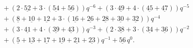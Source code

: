 \begin{align*}
	&\quad+(2\cdot\underline{52}+3\cdot(\underline{54}+\underline{56}))q^{-6}+(3\cdot\underline{49}+4\cdot(\underline{45}+\underline{47}))q^{-5}\\
	&\quad+(\underline{8}+\underline{10}+\underline{12}+3\cdot(\underline{16}+\underline{26}+\underline{28}+\underline{30}+\underline{32}))q^{-4}\\
	&\quad+(3\cdot\underline{41}+4\cdot(\underline{39}+\underline{43}))q^{-3}+(2\cdot\underline{38}+3\cdot(\underline{34}+\underline{36}))q^{-2}\\
	&\quad+(\underline{5}+\underline{13}+\underline{17}+\underline{19}+\underline{21}+\underline{23})q^{-1}+\underline{56}\,q^0.
\end{align*}

